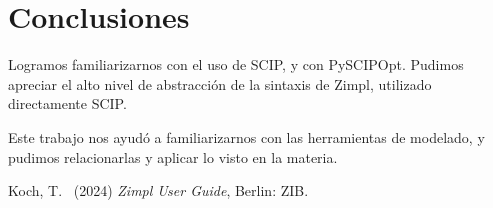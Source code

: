 \documentclass[11pt, a4paper, pdftex]{article}
\begin{document}
\newpage
\section{Conclusiones}

Logramos familiarizarnos con el uso de SCIP, y con PySCIPOpt.
Pudimos apreciar el alto nivel de abstracción de la sintaxis de Zimpl, utilizado directamente SCIP.

Este trabajo nos ayudó a familiarizarnos con las herramientas de modelado, y
pudimos relacionarlas y aplicar lo visto en la materia.

\begin{thebibliography}{99}
	Koch, T.\
	(2024)
	\emph{Zimpl User Guide},
	Berlin: ZIB.
\end{thebibliography}
\end{document}
